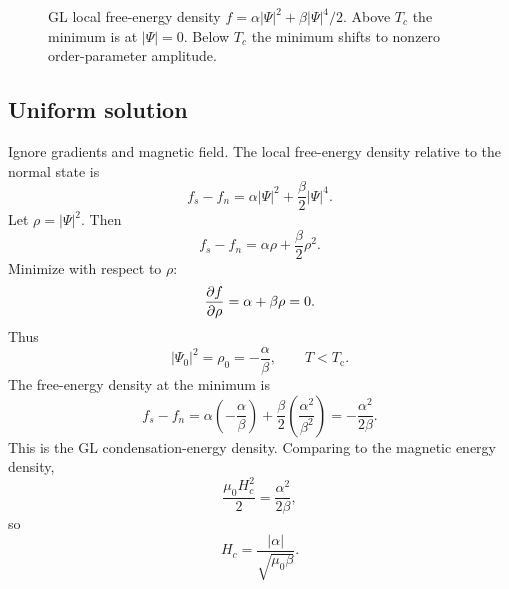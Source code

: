\documentclass[11pt]{article}
\numberwithin{equation}{section}
\newcommand{\Tc}{T_{\mathrm{c}}}
\newcommand{\Ord}{\Psi}
\begin{document}
\begin{figure}[H]
\centering
{}
\caption{GL local free-energy density $f=\alpha|\Psi|^2+\beta |\Psi|^4/2$. Above $T_c$ the minimum is at $|\Psi|=0$. Below $T_c$ the minimum shifts to nonzero order-parameter amplitude.}
\end{figure}

\subsection{Uniform solution}

Ignore gradients and magnetic field. The local free-energy density relative to the normal state is
\begin{equation}
f_s-f_n=\alpha|\Ord|^2+\frac{\beta}{2}|\Ord|^4.
\end{equation}
Let $\rho=|\Ord|^2$. Then
\begin{equation}
f_s-f_n=\alpha\rho+\frac{\beta}{2}\rho^2.
\end{equation}
Minimize with respect to $\rho$:
\begin{equation}
\pdv{f}{\rho}=\alpha+\beta\rho=0.
\end{equation}
Thus
\begin{equation}
|\Ord_0|^2=\rho_0=-\frac{\alpha}{\beta},\qquad T<\Tc.
\label{eq:gl_uniform_order}
\end{equation}
The free-energy density at the minimum is
\begin{equation}
f_s-f_n=\alpha\left(-\frac{\alpha}{\beta}\right)+\frac{\beta}{2}\left(\frac{\alpha^2}{\beta^2}\right)
=-\frac{\alpha^2}{2\beta}.
\label{eq:gl_condensation}
\end{equation}
This is the GL condensation-energy density. Comparing to the magnetic energy density,
\begin{equation}
\frac{\mu_0H_c^2}{2}=\frac{\alpha^2}{2\beta},
\end{equation}
so
\begin{equation}
\boxed{H_c=\frac{|\alpha|}{\sqrt{\mu_0\beta}}.}
\end{equation}
\end{document}

